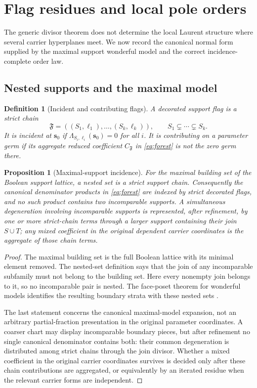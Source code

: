 \documentclass[11pt]{article}
\newtheorem{proposition}[theorem]{Proposition}
\newtheorem{definition}[theorem]{Definition}
\begin{document}
\section{Flag residues and local pole orders}
\label{sec:flags}

The generic divisor theorem does not determine the local Laurent
structure where several carrier hyperplanes meet.  We now record the
canonical normal form supplied by the maximal support wonderful model
and the correct incidence-complete order law.

\subsection{Nested supports and the maximal model}

\begin{definition}[Incident and contributing flags]
A \emph{decorated support flag} is a strict chain
\[
 \mathfrak F=((S_1,\ell_1),\ldots,(S_k,\ell_k)),
 \qquad S_1\subsetneq\cdots\subsetneq S_k.
\]
It is incident at \(\mathbf s_0\) if
\(\Lambda_{S_i,\ell_i}(\mathbf s_0)=0\) for all \(i\).  It is
contributing on a parameter germ if its aggregate reduced coefficient
\(C_{\mathfrak F}\) in \eqref{eq:forest} is not the zero germ there.
\end{definition}

\begin{proposition}[Maximal-support incidence]
\label{prop:maximal-incidence}
For the maximal building set of the Boolean support lattice, a nested
set is a strict support chain.  Consequently the canonical denominator
products in \eqref{eq:forest} are indexed by strict decorated flags, and
no such product contains two incomparable supports.  A simultaneous
degeneration involving incomparable supports is represented, after
refinement, by one or more strict-chain terms through a larger support
containing their join \(S\cup T\); any mixed coefficient in the
original dependent carrier coordinates is the aggregate of those chain
terms.
\end{proposition}

\begin{proof}
The maximal building set is the full Boolean lattice with its minimal
element removed.  The nested-set definition says that the join of any
incomparable subfamily must not belong to the building set.  Here every
nonempty join belongs to it, so no incomparable pair is nested.  The
face-poset theorem for wonderful models identifies the resulting
boundary strata with these nested sets
\cite{FeichtnerKozlov2004,DeConciniProcesi1995}.

The last statement concerns the canonical maximal-model expansion, not
an arbitrary partial-fraction presentation in the original parameter
coordinates.  A coarser chart may display incomparable boundary pieces,
but after refinement no single canonical denominator contains both:
their common degeneration is distributed among strict chains through
the join divisor.  Whether a mixed coefficient in the original carrier
coordinates survives is decided only after these chain contributions
are aggregated, or equivalently by an iterated residue when the relevant
carrier forms are independent.
\end{proof}
\end{document}
